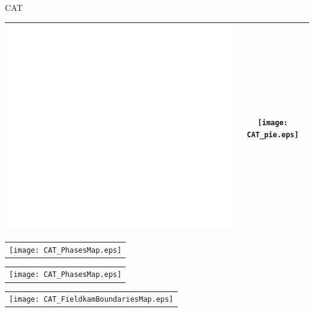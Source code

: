 \documentclass{article}
\newcommand{\framePaper}{
\begin{tikzpicture}[remember picture,overlay] 
 \draw[very thick] 
 ([yshift=-20pt,xshift=20pt]current page.north west)-- 
 ([yshift=-20pt,xshift=-20pt]current page.north east)-- 
 ([yshift=20pt,xshift=-20pt]current page.south east)-- 
 ([yshift=20pt,xshift=20pt]current page.south west)--cycle; 
 \end{tikzpicture}
 }
\begin{document}
 

\newpage



\begin{center}
\huge{CAT}
\end{center}

 \begin{tabular}{c c} 
\hline
\includegraphics[height=0.3\paperheight]{blank.eps} & \texttt{[image: CAT\_pie.eps]} \\
\hline
 \end{tabular}

 \begin{tabular}{c} 
 \texttt{[image: CAT\_PhasesMap.eps]} \\
 \end{tabular} 



\newpage

 \begin{tabular}{c} 
 \texttt{[image: CAT\_PhasesMap.eps]} \\
 \end{tabular} 


\newpage

 \begin{tabular}{c} 
 \texttt{[image: CAT\_FieldkamBoundariesMap.eps]} \\
 \end{tabular} 
\end{document}
